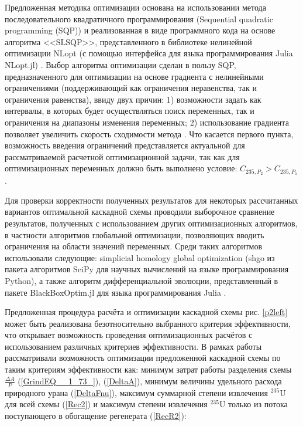 {Предложенная методика оптимизации основана на использовании метода последовательного квадратичного программирования (Sequential quadratic programming (SQP)) и реализованная в виде программного кода на основе алгоритма <<SLSQP>>, представленного в библиотеке нелинейной оптимизации NLopt (с помощью интерфейса для языка программирования Julia NLopt.jl) \cite{NLopt}. Выбор алгоритма оптимизации сделан в пользу SQP, предназначенного для оптимизации на основе градиента с нелинейными ограничениями (поддерживающий как ограничения неравенства, так и ограничения равенства), ввиду двух причин: 1) возможности задать как интервалы, в которых будет осуществляться поиск переменных, так и ограничения на диапазоны изменения переменных; 2) использование градиента позволяет увеличить скорость сходимости метода \cite{NumericalOptimization2006}. Что касается первого пункта, возможность введения ограничений представляется актуальной для рассматриваемой расчетной оптимизационной задачи, так как для оптимизационных переменных должно быть выполнено условие: ${C_{235,{P_2}}}>{C_{235,{P_1}}}$. 

Для проверки корректности полученных результатов для некоторых рассчитанных вариантов оптимальной каскадной схемы проводили выборочное сравнение результатов, полученных с использованием других оптимизационных алгоритмов, в частности алгоритмов глобальной оптимизации, позволяющих вводить ограничения на области значений переменных. Среди таких алгоритмов использовали следующие: simplicial homology global optimization (shgo из пакета алгоритмов SciPy для научных вычислений на языке программирования Python), а также алгоритм дифференциальной эволюции, представленный в пакете BlackBoxOptim.jl для языка программирования Julia \cite{пантелеевМетаэвристическиеАлгоритмыПоиска2009,virtanenSciPyFundamentalAlgorithms2020,endresSimplicialHomologyAlgorithm2018,mogensenOptimMathematicalOptimization2018,storn1997differential,Price-et-al-differential-evolution-2005,Feldt2018}.

Предложенная процедура расчёта и оптимизации каскадной схемы рис. \ref{p2left} может быть реализована безотносительно выбранного критерия эффективности, что открывает возможность проведения оптимизационных расчётов с использованием различных критериев эффективности. В рамках работы рассматривали возможность оптимизации предложенной каскадной схемы по таким критериям эффективности как: минимум затрат работы разделения схемы $\frac{\Delta A}{P}$ (\ref{GrindEQ__1_73_}), (\ref{DeltaA}), минимум величины удельного расхода природного урана (\ref{DeltaFnu}), максимум суммарной степени извлечения $^{235}$U для всей схемы (\ref{Rec2}) и максимум степени извлечения $^{235}$U  только из потока поступающего в обогащение регенерата (\ref{RecR2}):

}
